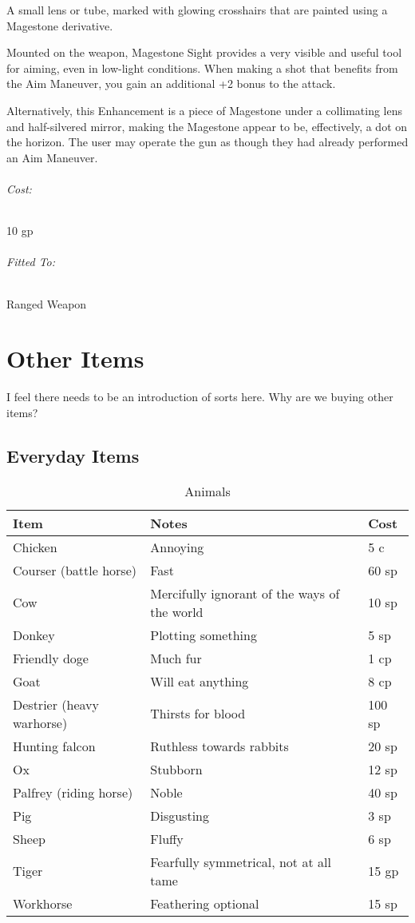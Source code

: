 \documentclass[oneside,11pt,english]{book}
\begin{document}
A small lens or tube, marked with glowing crosshairs that are painted using a Magestone derivative. 

Mounted on the weapon, Magestone Sight provides a very visible and useful tool for aiming, even in low-light conditions. When making a shot that benefits from the Aim Maneuver, you gain an additional +2 bonus to the attack.

Alternatively, this Enhancement is a piece of Magestone under a collimating lens and half-silvered mirror, making the Magestone appear to be, effectively, a dot on the horizon. The user may operate the gun as though they had already performed an Aim Maneuver. 
\vspace{-15pt}\subparagraph{Cost:} 10 gp
\vspace{-15pt}\subparagraph{Fitted To:} Ranged Weapon

\chapter{Other Items}\label{ch:Other Items} %
\startcontents[chapters]
\clearpage

I feel there needs to be an introduction of sorts here. Why are we buying other items?

\section{Everyday Items}
\begin{table}[hb]
	\centering
	\caption{Animals}
	\label{tab:Animals}
	\begin{tabu} spread 0pt {*{3}{X[-1]}}
		Item& Notes &Cost\\\toprule
Chicken &Annoying &5 c\\
Courser (battle horse) &Fast &60 sp\\
Cow &Mercifully ignorant of the ways of the world &10 sp\\
Donkey &Plotting something &5 sp\\
Friendly doge &Much fur &1 cp\\
Goat &Will eat anything &8 cp\\
Destrier (heavy warhorse) &Thirsts for blood &100 sp\\
Hunting falcon &Ruthless towards rabbits &20 sp\\
Ox &Stubborn &12 sp\\
Palfrey (riding horse) &Noble &40 sp\\
Pig &Disgusting &3 sp\\
Sheep &Fluffy &6 sp\\
Tiger &Fearfully symmetrical, not at all tame &15 gp\\
Workhorse &Feathering optional &15 sp\\
	\end{tabu}
\end{table}
\end{document}
